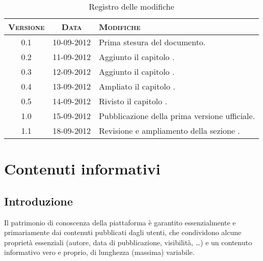 \documentclass[10pt,a4paper,headinclude,footinclude,hidelinks]{scrreprt} %
\begin{document}
    \title{\rmfamily\normalfont{}}
    \author{}
    \date{\today}
    
    \maketitle
    
    \begin{abstract}
        \noindent Il documento presenta i risultati delle fasi di analisi e di progettazione dei nuovi criteri di classificazione.
    \end{abstract}
    
	\begin{table}[ht]
	\centering
	\begin{tabular}{|c|c|l|}
	\hline
	\textsc{Versione} & \textsc{Data} & \textsc{Modifiche} \\ \hline
	0.1 & 10-09-2012 & Prima stesura del documento. \\ \hline
	0.2 & 11-09-2012 & Aggiunto il capitolo \nameref{ch:stage:contenuti}. \\ \hline
	0.3 & 12-09-2012 & Aggiunto il capitolo \nameref{ch:stage:req}. \\ \hline
	0.4 & 13-09-2012 & Ampliato il capitolo \nameref{ch:stage:req}. \\ \hline
	0.5 & 14-09-2012 & Rivisto il capitolo \nameref{ch:stage:req}. \\ \hline
	1.0 & 15-09-2012 & Pubblicazione della prima versione ufficiale. \\ \hline
	1.1 & 18-09-2012 & Revisione e ampliamento della sezione \nameref{ch:stage:req}. \\ \hline
	\end{tabular}
	\caption{Registro delle modifiche}
	\label{tab:stage:wp:workload}
	\end{table}

	\tableofcontents

	\chapter{Contenuti informativi}
	\label{ch:stage:contenuti}
	\section{Introduzione}
	Il patrimonio di conoscenza della piattaforma è garantito essenzialmente e primariamente dai contenuti pubblicati dagli utenti, che condividono alcune proprietà essenziali (autore, data di pubblicazione, visibilità, \ldots) e un contenuto informativo vero e proprio, di lunghezza (massima) variabile.
\end{document}
